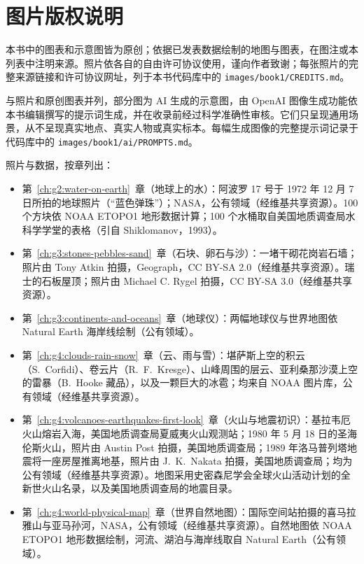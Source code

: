 \chapter*{图片版权说明}

本书中的图表和示意图皆为原创；依据已发表数据绘制的地图与图表，在图注或本列表中注明来源。照片依各自的自由许可协议使用，谨向作者致谢；每张照片的完整来源链接和许可协议网址，列于本书代码库中的 \texttt{images/book1/CREDITS.md}。

\bigskip
与照片和原创图表并列，部分图为 AI 生成的示意图，由 OpenAI 图像生成功能依本书编辑撰写的提示词生成，并在收录前经过科学准确性审核。它们只呈现通用场景，从不呈现真实地点、真实人物或真实标本。每幅生成图像的完整提示词记录于代码库中的 \texttt{images/book1/ai/PROMPTS.md}。

\bigskip
\noindent 照片与数据，按章列出：
\begin{itemize}\small
  \item 第~\ref{ch:g2:water-on-earth}~章（地球上的水）：阿波罗 17 号于 1972 年 12 月 7 日所拍的地球照片（“蓝色弹珠”）；NASA，公有领域（经维基共享资源）。100 个方块依 NOAA ETOPO1 地形数据计算；100 个水桶取自美国地质调查局水科学学堂的表格（引自 Shiklomanov，1993）。
  \item 第~\ref{ch:g3:stones-pebbles-sand}~章（石块、卵石与沙）：一堵干砌花岗岩石墙；照片由 Tony Atkin 拍摄，Geograph，CC BY-SA 2.0（经维基共享资源）。瑞士的石板屋顶；照片由 Michael C. Rygel 拍摄，CC BY-SA 3.0（经维基共享资源）。
  \item 第~\ref{ch:g3:continents-and-oceans}~章（地球仪）：两幅地球仪与世界地图依 Natural Earth 海岸线绘制（公有领域）。
  \item 第~\ref{ch:g4:clouds-rain-snow}~章（云、雨与雪）：堪萨斯上空的积云（S.~Corfidi）、卷云片（R.~F.~Kresge）、山峰周围的层云、亚利桑那沙漠上空的雷暴（B.~Hooke 藏品），以及一颗巨大的冰雹；均来自 NOAA 图片库，公有领域（经维基共享资源）。
  \item 第~\ref{ch:g4:volcanoes-earthquakes-first-look}~章（火山与地震初识）：基拉韦厄火山熔岩入海，美国地质调查局夏威夷火山观测站；1980 年 5 月 18 日的圣海伦斯火山，照片由 Austin Post 拍摄，美国地质调查局；1989 年洛马普列塔地震将一座房屋推离地基，照片由 J.~K.~Nakata 拍摄，美国地质调查局；均为公有领域（经维基共享资源）。地图采用史密森尼学会全球火山活动计划的全新世火山名录，以及美国地质调查局的地震目录。
  \item 第~\ref{ch:g4:world-physical-map}~章（世界自然地图）：国际空间站拍摄的喜马拉雅山与亚马孙河，NASA，公有领域（经维基共享资源）。自然地图依 NOAA ETOPO1 地形数据绘制，河流、湖泊与海岸线取自 Natural Earth（公有领域）。

\end{itemize}

